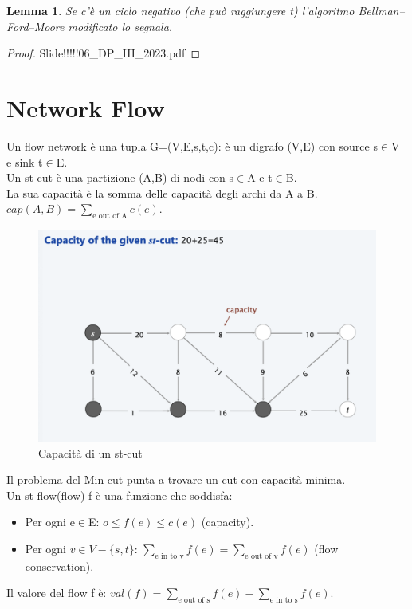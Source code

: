 \documentclass{article}
\newtheorem{lemma}{Lemma}[subsection]
\begin{document}
\begin{lemma}
    Se c'è un ciclo negativo (che può raggiungere t) l'algoritmo Bellman–Ford–Moore modificato lo segnala.
\end{lemma}
\begin{proof}
    Slide!!!!!06\_DP\_III\_2023.pdf
\end{proof}
\section{Network Flow}
Un flow network è una tupla G=(V,E,s,t,c): è un digrafo (V,E) con source s$\in$V e sink t$\in$E.\\
Un st-cut è una partizione (A,B) di nodi con s$\in$A e t$\in$B.\\
La sua capacità è la somma delle capacità degli archi da A a B.\\
$cap(A,B)=\sum_{\mbox{e out of A}}c(e)$.
\begin{figure}[H]
    \centering
    \includegraphics[width=0.5\linewidth]{Screenshot 2024-04-26 alle 10.42.54.png}
    \caption{Capacità di un st-cut}
    \label{fig:enter-label}
\end{figure}
Il problema del Min-cut punta a trovare un cut con capacità minima.\\
Un st-flow(flow) f è una funzione che soddisfa:
\begin{itemize}
    \item Per ogni e$\in$E: $o\leq f(e) \leq c(e)$ (capacity).
    \item Per ogni $v\in V -\{s,t\}$: $\sum_{\mbox{e in to v}}f(e)=\sum_{\mbox{e out of v}}f(e)$ (flow conservation).
\end{itemize}
Il valore del flow f è: $val(f)=\sum_{\mbox{e out of s}}f(e)-\sum_{\mbox{e in to s}}f(e)$.
\end{document}
